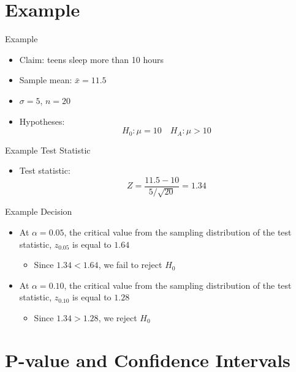 \documentclass[12pt, aspectratio=169]{beamer}
\begin{document}
    \section{Example}


    \begin{frame}{Example}
        \begin{itemize}
            \item Claim: teens sleep more than 10 hours
            \item Sample mean: $\bar{x} = 11.5$
            \item $\sigma = 5$, $n = 20$
            \item Hypotheses:
            \[
            H_0: \mu = 10 \quad H_A: \mu > 10
            \]
        \end{itemize}
    \end{frame}


    \begin{frame}{Example Test Statistic}
        \begin{itemize}
            \item Test statistic:
            \[
            Z = \frac{11.5 - 10}{5/\sqrt{20}} = 1.34
            \]
        \end{itemize}
    \end{frame}


    \begin{frame}{Example Decision}
        \begin{itemize}
            \item At $\alpha = 0.05$, the critical value from the sampling distribution of the test statistic, \(z_{0.05}\) is equal to \(1.64\)
            \begin{itemize}
                \item Since $1.34 < 1.64$, we fail to reject $H_0$
            \end{itemize}
            \item At $\alpha = 0.10$, the critical value from the sampling distribution of the test statistic, \(z_{0.10}\) is equal to \(1.28\)
            \begin{itemize}
                \item Since $1.34 > 1.28$, we reject $H_0$
            \end{itemize}
        \end{itemize}
    \end{frame}


    \section{P-value and Confidence Intervals}
\end{document}
